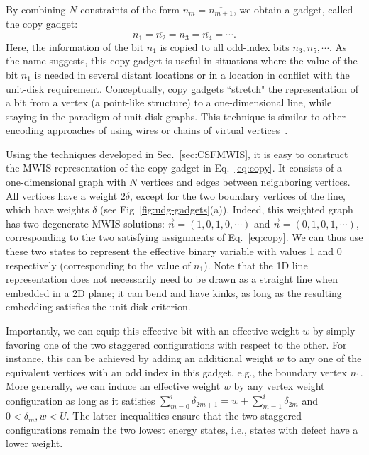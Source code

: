 By combining $N$ constraints of the form $n_m = \overline{n_{m+1}}$, we obtain a gadget, called the copy gadget: 
\begin{equation}\label{eq:copy}
n_1 = \overline{n_2} = n_3 = \overline{n_4} = \cdots .
\end{equation}
Here, the information of the bit $n_1$ is copied to all odd-index bits $n_3, n_5, \cdots$. As the name suggests, this copy gadget is useful in situations where the value of the bit $n_1$ is needed in several distant locations or in a location in conflict with the unit-disk requirement. Conceptually, copy gadgets ``stretch" the representation of a bit from a vertex (a point-like structure) to a one-dimensional line, while staying in the paradigm of unit-disk graphs. This technique is similar to other encoding approaches of using wires or chains of virtual vertices~\cite{Pichler2018complexity, Choi_2010, knysh2005, Qiu2020Programmable, Kim2022Rydberg}.

Using the techniques developed in Sec.~\ref{sec:CSFMWIS}, it is easy to construct the MWIS representation of the copy gadget in Eq.~\ref{eq:copy}. It consists of a one-dimensional graph with $N$ vertices and edges between neighboring vertices. All vertices have a weight $2\delta$, except for the two boundary vertices of the line, which have weights $\delta$ (see Fig~\ref{fig:udg-gadgets}(a)). Indeed, this weighted graph has two degenerate MWIS solutions: $\vec{n} = (1, 0, 1, 0, \cdots)$ and $\vec{n} = (0, 1, 0, 1,\cdots)$, corresponding to the two satisfying assignments of Eq.~\eqref{eq:copy}. We can thus use these two states to represent the effective binary variable with values 1 and 0 respectively (corresponding to the value of $n_1$). Note that the 1D line representation does not necessarily need to be drawn as a straight line when embedded in a 2D plane; it can bend and have kinks, as long as the resulting embedding satisfies the unit-disk criterion.  

Importantly, we can equip this effective bit with an effective weight $w$ by simply favoring one of the two staggered configurations with respect to the other. For instance, this can be achieved by adding an additional weight $w$ to any one of the equivalent vertices with an odd index in this gadget, e.g., the boundary vertex $n_1$. More generally, we can induce an effective weight $w$ by any vertex weight configuration as long as it satisfies $\sum_{m = 0}^i \delta_{2m + 1} = w + \sum_{m = 1}^i \delta_{2m}$ and $ 0 < \delta_m, w < U$. The latter inequalities ensure that the two staggered configurations remain the two lowest energy states, i.e., states with defect have a lower weight. 

